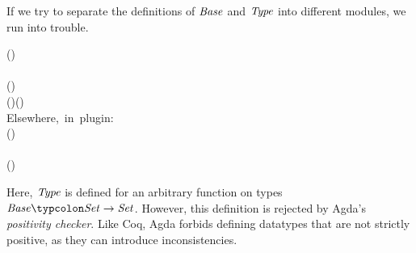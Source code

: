 If we try to separate the definitions of \ensuremath{\Conid{Base}} and \ensuremath{\Conid{Type}} into
different modules, we run into trouble.
\begin{hscode}\SaveRestoreHook
{}%
%
%
%
%
%
%
%
%
%
%
%
\>[B]{}\;\;(\typcolon{}\to {})\;\<[E]%
\\
\>[B]{}\<[3]%
\>[3]{}\;\typcolon{}\;\<[E]%
\\
\>[3]{}\<[5]%
\>[5]{}\<[11]%
\>[11]{}\typcolon{}\<[11E]%
\>[14]{}\;(\iota\typcolon{}\;){}\<[48]%
\>[48]{}\to {}\<[E]%
\\
\>[3]{}\<[5]%
\>[5]{}\text{\textunderscore}\mathord{\Rightarrow}\text{\textunderscore}{}\<[11]%
\>[11]{}\typcolon{}\<[11E]%
\>[14]{}\;(\sigma\typcolon{}){}\<[32]%
\>[32]{}\to (\tau\typcolon{})\to {}\<[E]%
\\[\blanklineskip]%
\>[B]{}\mbox{\onelinecomment  Elsewhere, in plugin:}{}\<[E]%
\\[\blanklineskip]%
\>[B]{}\;\;(\typcolon{})\typcolon{}\;\<[E]%
\\
\>[B]{}\<[3]%
\>[3]{}\<[12]%
\>[12]{}\typcolon{}\<[12E]%
\>[15]{}\;\;\<[E]%
\\
\>[B]{}\<[3]%
\>[3]{}\<[12]%
\>[12]{}\typcolon{}\<[12E]%
\>[15]{}\;(\iota\typcolon{})\to {}\;\<[E]%
\ColumnHook
\end{hscode}\resethooks

Here, \ensuremath{\Conid{Type}} is defined for an arbitrary function on types \ensuremath{\Conid{Base}\typcolon\Conid{Set}\to \Conid{Set}}. However, this definition is rejected by Agda's
\emph{positivity checker}. Like Coq, Agda forbids defining
datatypes that are not strictly positive, as they can introduce
inconsistencies.

